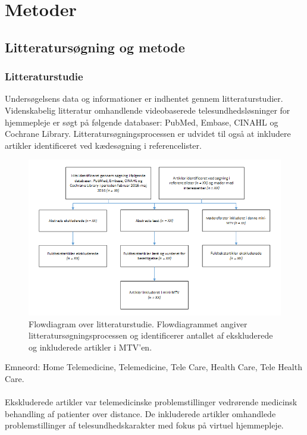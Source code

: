 \chapter{Metoder}
\section{Litteratursøgning og metode}
\subsection{Litteraturstudie}
Undersøgelsens data og informationer er indhentet gennem litteraturstudier. Videnskabelig litteratur omhandlende videobaserede telesundhedsløsninger for hjemmepleje er søgt på følgende databaser: PubMed, Embase, CINAHL og Cochrane Library. Litteratursøgningsprocessen er udvidet til også at inkludere artikler identificeret ved kædesøgning i referencelister.\\
\begin{figure}[H]
\centering
\includegraphics[width=1\textwidth]{Figurer/metode_flow.png}
\caption{\label{fig:metodeflow}Flowdiagram over  litteraturstudie. Flowdiagrammet angiver litteratursøgningsprocessen og identificerer antallet af ekskluderede og inkluderede artikler i MTV'en.}
\end{figure}

Emneord: Home Telemedicine, Telemedicine, Tele Care, Health Care, Tele Health Care.\\ \\
Ekskluderede artikler var telemedicinske problemstillinger vedrørende medicinsk behandling af patienter over distance. De inkluderede artikler omhandlede problemstillinger af telesundhedskarakter med fokus på virtuel hjemmepleje. 

